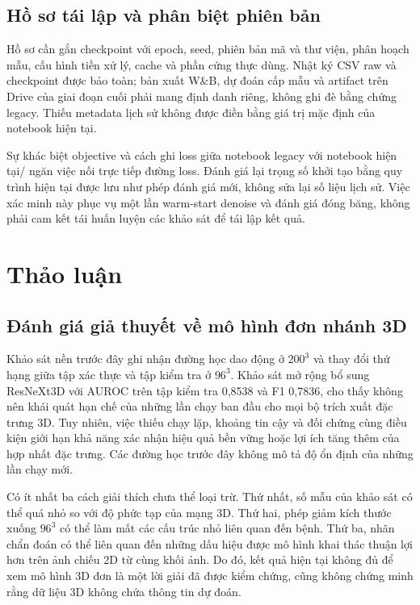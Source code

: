 \documentclass[14pt,a4paper,oneside]{extreport}
\begin{document}
\subsection{Hồ sơ tái lập và phân biệt phiên bản}
Hồ sơ cần gắn checkpoint với epoch, seed, phiên bản mã và thư viện,
phân hoạch mẫu, cấu hình tiền xử lý, cache và phần cứng thực dùng.
Nhật ký CSV raw và checkpoint được bảo toàn; bản xuất W\&B, dự đoán
cấp mẫu và artifact trên Drive của giai đoạn cuối phải mang định danh
riêng, không ghi đè bằng chứng legacy. Thiếu metadata lịch sử không
được điền bằng giá trị mặc định của notebook hiện tại.

Sự khác biệt objective và cách ghi loss giữa notebook legacy với
notebook hiện tại/ ngăn việc nối trực tiếp
đường loss. Đánh giá lại trọng số khởi tạo bằng quy trình hiện tại
được lưu như phép đánh giá mới, không sửa lại số liệu lịch sử. Việc
xác minh này phục vụ một lần warm-start denoise và đánh giá đóng băng,
không phải cam kết tái huấn luyện các khảo sát để tái lập kết quả.

\section{Thảo luận}
\label{sec:auxiliary-analysis}

\subsection{Đánh giá giả thuyết về mô hình đơn nhánh 3D}
Khảo sát nền trước đây ghi nhận đường học dao động ở $200^3$ và thay đổi
thứ hạng giữa tập xác thực và tập kiểm tra ở $96^3$. Khảo sát mở rộng bổ sung
ResNeXt3D với AUROC trên tập kiểm tra 0,8538 và F1 0,7836, cho thấy không nên
khái quát hạn chế của những lần chạy ban đầu cho mọi bộ trích xuất đặc trưng 3D.
Tuy nhiên, việc thiếu chạy lặp, khoảng tin cậy và đối chứng cùng điều kiện
giới hạn khả năng xác nhận hiệu quả bền vững hoặc lợi ích tăng thêm của hợp nhất đặc trưng.
Các đường học trước đây không mô tả độ ổn định của những lần chạy mới.

Có ít nhất ba cách giải thích chưa thể loại trừ. Thứ nhất, số mẫu của khảo sát có
thể quá nhỏ so với độ phức tạp của mạng 3D. Thứ hai, phép giảm kích thước xuống
$96^3$ có thể làm mất các cấu trúc nhỏ liên quan đến bệnh. Thứ ba, nhãn chẩn đoán
có thể liên quan đến những dấu hiệu được mô hình khai thác thuận lợi hơn trên
ảnh chiếu 2D từ cùng khối ảnh. Do đó, kết quả hiện tại không đủ để xem
mô hình 3D đơn là một lời giải đã được kiểm chứng, cũng không chứng minh
rằng dữ liệu 3D không chứa thông tin dự đoán.
\end{document}
